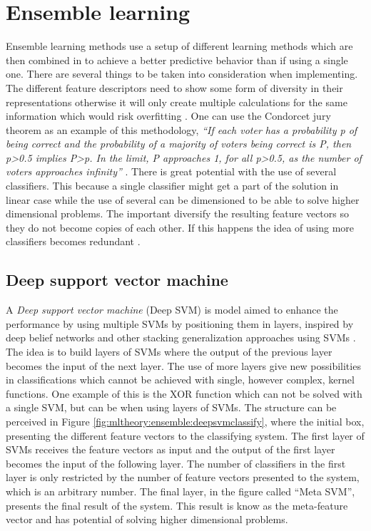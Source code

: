 
\section{Ensemble learning}

Ensemble learning methods use a setup of different learning methods which are then combined in to achieve a better predictive behavior than if using a single one. There are several things to be taken into consideration when implementing. The different feature descriptors need to show some form of diversity in their representations otherwise it will only create multiple calculations for the same information which would risk overfitting \cite{cunningham2000diversity}\cite{krogh1995neural}. One can use the Condorcet jury theorem as an example of this methodology, \textit{``If each voter has a probability p of being correct and the probability of a majority of voters being correct is P, then p>0.5 implies P>p. In the limit, P approaches 1, for all p>0.5, as the number of voters approaches infinity''} \cite{cord2008machine}\cite{grofman1983thirteen}.
There is great potential with the use of several classifiers. This because a single classifier  might get a part of the solution in linear case while the use of several can be dimensioned to be able to solve higher dimensional problems. The important diversify the resulting feature vectors so they do not become copies of each other. If this happens the idea of using more classifiers becomes redundant \cite{kim2003ensembleSVM}. 


\subsection{Deep support vector machine}
\label{sec:deepSVM}
A \emph{Deep support vector machine} (Deep SVM) is model aimed to enhance the performance by using multiple SVMs by positioning them in layers, inspired by deep belief networks \cite{hinton2006reducing} and other stacking generalization approaches using SVMs \cite{chen2009using}.
The idea is to build layers of SVMs where the output of the previous layer becomes the input of the next layer. The use of more layers give new possibilities in classifications which cannot be achieved with single, however complex, kernel functions. One example of this is the XOR function which can not be solved with a single SVM, but can be when using layers of SVMs. The structure can be perceived in Figure \ref{fig:mltheory:ensemble:deepsvmclassify}, where the initial box, presenting the different feature vectors to the classifying system. The first layer of SVMs receives the feature vectors as input and the output of the first layer becomes the input of the following layer. The number of classifiers in the first layer is only restricted by the number of feature vectors presented to the system, which is an arbitrary number. The final layer, in the figure called ``Meta SVM'', presents the final result of the system. This result is know as the meta-feature vector and has potential of solving higher dimensional problems.

